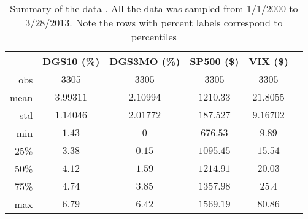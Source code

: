 \begin{table}[ht]
	\begin{center}
	\label{tab:describe}
		\begin{tabular}{r|ccccc}
		\toprule
			 & DGS10  (\%)& DGS3MO  (\%)& SP500 (\$)& VIX (\$)\\
			\midrule
			\midrule
			obs & $3305$ & $3305$ & $3305$ & $3305$\\
			mean & $3.99311$ & $2.10994$ & $1210.33$ & $21.8055$\\
			std & $1.14046$ & $2.01772$ & $187.527$ & $9.16702$\\
			min & $1.43$ & $0$ & $676.53$ & $9.89$\\
			25\% & $3.38$ & $0.15$ & $1095.45$ & $15.54$\\
			50\% & $4.12$ & $1.59$ & $1214.91$ & $20.03$\\
			75\% & $4.74$ & $3.85$ & $1357.98$ & $25.4$\\
			max & $6.79$ & $6.42$ & $1569.19$ & $80.86$\\
		\bottomrule
		\end{tabular}
		\caption{\small Summary of the data . All the data was sampled from 1/1/2000 to 3/28/2013. Note the rows with percent labels correspond to percentiles}
	\end{center}
\end{table}
